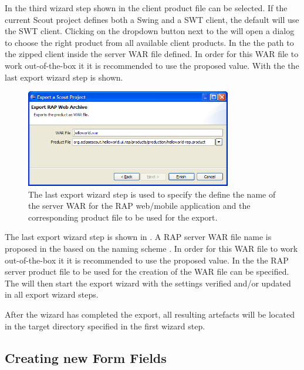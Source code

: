 \documentclass[a4paper,10pt,twoside]{book}
\begin{document}
In the third wizard step shown in  the client product file can be selected. 
If the current Scout project defines both a Swing and a SWT client, the default will use the SWT client. 
Clicking on the dropdown button next to the  will open a  dialog to choose the right product from all available client products. 
In the  the path to the zipped client inside the server WAR file defined. 
In order for this WAR file to work out-of-the-box it it is recommended to use the proposed value. 
With the  the last export wizard step is shown.

\begin{figure}
\includegraphics[width=9cm]{wizard_export_rap_server.png}
\caption{The last export wizard step is used to specify the define the name of the server WAR for the RAP web/mobile application and the corresponding product file to be used for the export.}
\end{figure}

The last export wizard step is shown in . 
A RAP server WAR file name is proposed in the  based on the naming scheme . 
In order for this WAR file to work out-of-the-box it it is recommended to use the proposed value. 
In the  the RAP server product file to be used for the creation of the WAR file can be specified. 
The  will then start the export wizard with the settings verified and/or updated in all export wizard steps. 

After the wizard has completed the export, all resulting artefacts will be located in the target directory specified in the first wizard step. 

\subsection{Creating new Form Fields}
\end{document}
